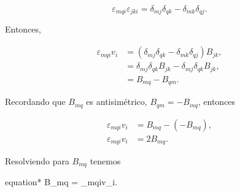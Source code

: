 \documentclass[../main.tex]{subfiles}
\begin{document}
\begin{problema}
\begin{enumerate}
		      \begin{equation*}
			      \varepsilon_{mqi}\varepsilon_{jki} = \delta_{mj}\delta_{qk} - \delta_{mk}\delta_{qj}.
		      \end{equation*}

		      Entonces,

		      \begin{align*}
			      \varepsilon_{mqi}v_{i} & = (\delta_{mj}\delta_{qk} - \delta_{mk}\delta_{qj})B_{jk},     \\
			                             & = \delta_{mj}\delta_{qk}B_{jk} - \delta_{mj}\delta_{qk}B_{jk}, \\
			                             & = B_{mq} - B_{qm}.
		      \end{align*}

		      Recordando que \(B_{mq}\) es antisimétrico, \(B_{qm} = - B_{mq}\), entonces

		      \begin{align*}
			      \varepsilon_{mqi}v_{i} & = B_{mq} - (- B_{mq}), \\
			      \varepsilon_{mqi}v_{i} & = 2B_{mq}.
		      \end{align*}

		      Resolviendo para \(B_{mq}\) tenemos

		      \begin{empheq}[box=\mainresult]{equation*}
			      B_{mq} = \varepsilon_{mqi}v_{i}.
		      \end{empheq}


	\end{enumerate}
\end{problema}
\end{document}

